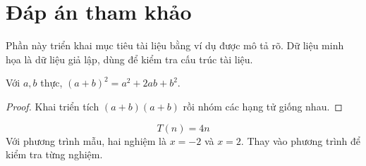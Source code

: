 \section{Đáp án tham khảo}


\label{sec:chapter2}
Phần này triển khai mục tiêu tài liệu bằng ví dụ được mô tả rõ. Dữ liệu minh họa là dữ liệu giả lập, dùng để kiểm tra cấu trúc tài liệu.

\begin{demotheorem}
Với $a,b$ thực, $(a+b)^2=a^2+2ab+b^2$.
\end{demotheorem}
\begin{proof}
Khai triển tích $(a+b)(a+b)$ rồi nhóm các hạng tử giống nhau.
\end{proof}
\[T(n)=4n\]
Với phương trình mẫu, hai nghiệm là $x=-2$ và $x=2$. Thay vào phương trình để kiểm tra từng nghiệm.
